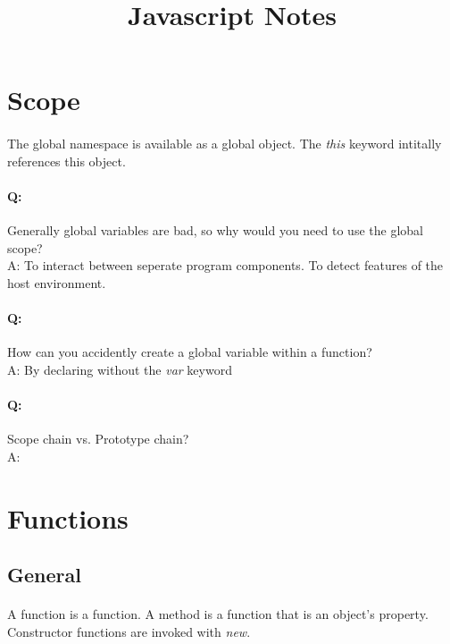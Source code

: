 \documentclass[11pt]{article} %
\title{Javascript Notes}
\begin{document}
\maketitle

\tableofcontents

\section{Scope}

\paragraph{} The global namespace is available as a global object. The \emph{this} keyword intitally
references this object.

\paragraph{Q:} Generally global variables are bad, so why would you need to use the global scope?\\
A: To interact between seperate program components. To detect features of the host
environment.

\paragraph{Q:} How can you accidently create a global variable within a function?\\
A: By declaring without the \emph{var} keyword

\paragraph{Q:} Scope chain vs. Prototype chain?\\
A: 

\section{Functions}

\subsection{General}

\paragraph{} A function is a function. A method is a function that is an object's property. Constructor
functions are invoked with \emph{new}.
\end{document}
